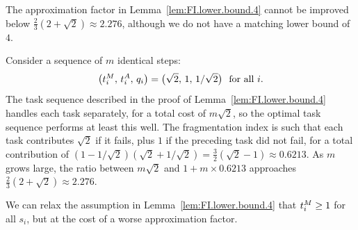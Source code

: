 The approximation factor in Lemma~\ref{lem:FI.lower.bound.4} cannot be improved below $\tfrac{2}{3}(2+\sqrt{2}) \approx 2.276$, although we do not have a matching lower bound of $4$.

\begin{example}
\label{ex:FI.lower.gap}
Consider a sequence of $m$ identical steps:
\[ \bigl(\manualTime{i},\, \AItime{i},\, q_i\bigr) = \bigl(\sqrt{2},\, 1,\, 1/\sqrt{2}\bigr) \ \text{ for all $i$}. \]
The task sequence described in the proof of Lemma~\ref{lem:FI.lower.bound.4} handles each task separately, for a total cost of $m \sqrt{2}$, so the optimal task sequence performs at least this well.
The fragmentation index is such that each task contributes $\sqrt{2}$ if it fails, plus $1$ if the preceding task did not fail, for a total contribution of $(1-1/\sqrt{2})(\sqrt{2} + 1/\sqrt{2}) = \tfrac{3}{2}(\sqrt{2}-1) \approx 0.6213$.
As $m$ grows large, the ratio between $m\sqrt{2}$ and $1 + m \times 0.6213$ approaches $\tfrac{2}{3}(2+\sqrt{2}) \approx 2.276$.
\end{example}

We can relax the assumption in Lemma~\ref{lem:FI.lower.bound.4} that $t^{M}_{i} \geq 1$ for all $s_i$, but at the cost of a worse approximation factor.

